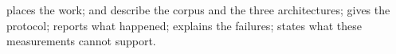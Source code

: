  places the work;  and 
describe the corpus and the three architectures;  gives the
protocol;  reports what happened;  explains
the failures;  states what these measurements cannot support.
